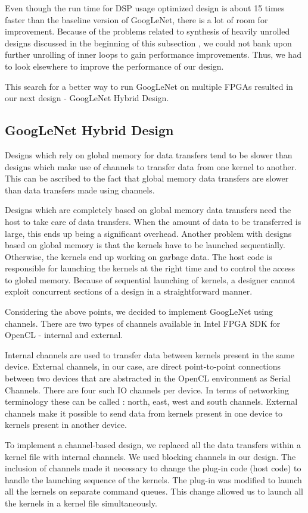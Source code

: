 Even though the run time for DSP usage optimized design is about 15 times faster than the baseline version of GoogLeNet, there is a lot of room for improvement. Because of the problems related to synthesis of heavily unrolled designs discussed in the beginning of this subsection , we could not bank upon further unrolling of inner loops to gain performance improvements. Thus, we had to look elsewhere to improve the performance of our design.


This search for a better way to run GoogLeNet on multiple FPGAs resulted in our next design - GoogLeNet Hybrid Design.

\subsection{GoogLeNet Hybrid Design}
Designs which rely on global memory for data transfers tend to be slower than designs which make use of channels to transfer data from one kernel to another. This can be ascribed to the fact that global memory data transfers are slower than data transfers made using channels.  

Designs which are completely based on global memory data transfers need the host to take care of data transfers. When the amount of data to be transferred is large, this ends up being a significant overhead. Another problem with designs based on global memory is that the kernels have to be launched sequentially. Otherwise, the kernels end up working on garbage data. The host code is responsible for launching the kernels at the right time and to control the access to global memory. Because of sequential launching of kernels, a designer cannot exploit concurrent sections of a design in a straightforward manner. 

Considering the above points, we decided to implement GoogLeNet using channels. There are two types of channels available in Intel FPGA SDK for OpenCL - internal and external.

Internal channels are used to transfer data between kernels present in the same device. External channels, in our case, are direct point-to-point connections between two devices that are abstracted in the OpenCL environment as Serial Channels. There are four such IO channels per device. In terms of networking terminology these can be called : north, east, west and south channels. External channels make it possible to send data from kernels present in one device to kernels present in another device. 

To implement a channel-based design, we replaced all the data transfers within a kernel file with internal channels. We used blocking channels in our design. The inclusion of channels made it necessary to change the plug-in code (host code) to handle the launching sequence of the kernels. The plug-in was modified to launch all the kernels on separate command queues. This change allowed us to launch all the kernels in a kernel file simultaneously. 


